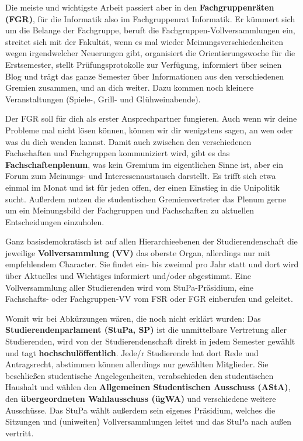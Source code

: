 \begin{figure*}[bt]
\end{figure*}

Die meiste und wichtigste Arbeit passiert aber in den \textbf{Fachgruppenräten (FGR)}, für die Informatik also im Fachgruppenrat Informatik. Er kümmert sich um die Belange der Fachgruppe, beruft die Fachgruppen-Vollversammlungen ein, streitet sich mit der
Fakultät, wenn es mal wieder Meinungsverschiedenheiten wegen irgendwelcher Neuerungen gibt, organisiert die Orientierungswoche für die Erstsemester, stellt Prüfungsprotokolle zur Verfügung, informiert über seinen Blog \fginfoUrl und trägt das ganze Semester über Informationen aus den verschiedenen Gremien zusammen, und an dich weiter.
Dazu kommen noch kleinere Veranstaltungen (Spiele-, Grill- und Glühweinabende).

Der FGR soll für dich als erster Ansprechpartner fungieren. Auch wenn wir deine Probleme mal nicht lösen können, können wir dir wenigstens sagen, an wen oder was du dich wenden
kannst. Damit auch zwischen den verschiedenen Fachschaften und Fachgruppen kommuniziert wird, gibt es das \textbf{Fachschaftenplenum}, was kein Gremium im eigentlichen Sinne ist, aber ein Forum zum Meinungs- und Interessenaustausch darstellt. Es trifft sich etwa einmal im Monat und ist für jeden offen, der einen Einstieg in die Unipolitik sucht. Außerdem nutzen die studentischen Gremienvertreter das Plenum gerne um ein Meinungsbild der Fachgruppen und Fachschaften zu aktuellen Entscheidungen einzuholen.

Ganz basisdemokratisch ist auf allen Hierarchie\-ebenen der Studierendenschaft
die jeweilige \textbf{Vollversammlung (VV)} das oberste Organ, allerdings nur
mit empfehlendem Character. Sie findet ein- bis zweimal pro Jahr statt und
dort wird über Aktuelles und Wichtiges informiert und/oder abgestimmt. Eine
Vollversammlung aller Studierenden wird vom StuPa-Präsidium, eine 
Fachschafts- oder Fachgruppen-VV vom FSR oder FGR einberufen und geleitet.

Womit wir bei Abkürzungen wären, die noch nicht erklärt wurden: Das \textbf{Studierendenparlament (StuPa, SP)} ist die 
unmittelbare Vertretung aller Studierenden, wird von der Studierendenschaft 
direkt in jedem Semester gewählt und tagt \textbf{hochschulöffentlich}.
Jede/r Studierende hat dort Rede und Antragsrecht, abstimmen können allerdings nur 
gewählten Mitglieder. Sie beschließen studentische Angelegenheiten, verabschieden den studentischen
Haushalt und wählen den \textbf{Allgemeinen Studentischen Ausschuss (AStA)},
den \textbf{übergeordneten Wahlausschuss (ügWA)}
und verschiedene weitere Ausschüsse. Das StuPa wählt außerdem sein eigenes
Präsidium, welches die Sitzungen und (uniweiten) Vollversammlungen leitet und
das StuPa nach außen  vertritt.  

